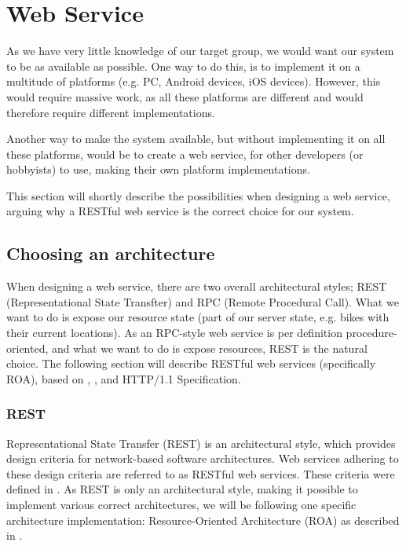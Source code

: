 \section{Web Service}
As we have very little knowledge of our target group, we would want our system to be as available as possible.
One way to do this, is to implement it on a multitude of platforms (e.g. PC, Android devices, iOS devices).
However, this would require massive work, as all these platforms are different and would therefore require different implementations.

Another way to make the system available, but without implementing it on all these platforms, would be to create a web service, for other developers (or hobbyists) to use, making their own platform implementations.

This section will shortly describe the possibilities when designing a web service, arguing why a RESTful web service is the correct choice for our system.

\subsection{Choosing an architecture}
When designing a web service, there are two overall architectural styles; REST (Representational State Transfter) and RPC (Remote Procedural Call).
What we want to do is expose our resource state (part of our server state, e.g. bikes with their current locations).
As an RPC-style web service is per definition procedure-oriented, and what we want to do is expose resources, REST is the natural choice.
The following section will describe RESTful web services (specifically ROA), based on  \citet{restful_web_services}, \citet{fielding_dissertation}, and HTTP/1.1 Specification\cite{http_specification}.

\subsubsection{REST}
Representational State Transfer (REST) is an architectural style, which provides design criteria for network-based software architectures.
Web services adhering to these design criteria are referred to as RESTful web services.
These criteria were defined in \citet{fielding_dissertation}.
As REST is only an architectural style, making it possible to implement various correct architectures, we will be following one specific architecture implementation: Resource-Oriented Architecture (ROA) as described in \citet{restful_web_services}.

